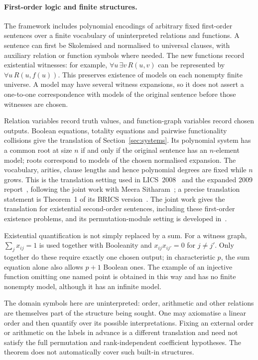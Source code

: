 \paragraph{First-order logic and finite structures.}
The framework includes polynomial encodings of arbitrary fixed
first-order sentences over a finite vocabulary of uninterpreted
relations and functions. A sentence can first be Skolemised and
normalised to universal clauses, with auxiliary relation or function
symbols where needed. The new functions record existential witnesses:
for example, $\forall u\,\exists v\,R(u,v)$ can be represented by
$\forall u\,R(u,f(u))$. This preserves existence of models on each
nonempty finite universe. A model may have several witness expansions,
so it does not assert a one-to-one correspondence with models of the
original sentence before those witnesses are chosen.

Relation variables record truth values, and function-graph variables
record chosen outputs. Boolean equations, totality equations and
pairwise functionality collisions give the translation of
Section~\ref{sec:systems}. Its polynomial system has a common root
at size $n$ if and only if the original sentence has an $n$-element
model; roots correspond to models of the chosen normalised expansion.
The vocabulary, arities, clause lengths and hence polynomial degrees
are fixed while $n$ grows. This is the translation setting used in
LICS~2008~\cite[Section~1.2, p.~273]{Riis} and the expanded
2009 report~\cite[Section~1.2, pp.~3--4]{RiisLong}, following the joint work
with Meera Sitharam~\cite{RiisSitharamTautologies}; a precise translation
statement is Theorem~1 of its BRICS version~\cite[Section~II]{RiisSitharamTranslationPreprint}. The joint work gives the
translation for existential second-order sentences, including these
first-order existence problems, and its permutation-module setting is
developed in~\cite{RiisSitharamModules}.

Existential quantification is not simply replaced by a sum. For a
witness graph, $\sum_j x_{ij}=1$ is used together with Booleanity and
$x_{ij}x_{ij'}=0$ for $j\ne j'$. Only together do these require exactly
one chosen output; in characteristic $p$, the sum equation alone also
allows $p+1$ Boolean ones. The example of an injective function omitting
one named point is obtained in this way and has no finite nonempty
model, although it has an infinite model.

The domain symbols here are uninterpreted: order, arithmetic and
other relations are themselves part of the structure being sought.
One may axiomatise a linear order and then quantify over its possible
interpretations. Fixing an external order or arithmetic on the labels
in advance is a different translation and need not satisfy the full
permutation and rank-independent coefficient hypotheses. The theorem
does not automatically cover such built-in structures.

